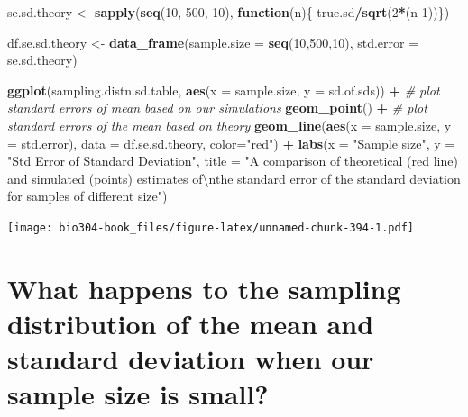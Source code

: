 \documentclass[]{book}
\newenvironment{Shaded}{\begin{snugshade}}{\end{snugshade}}
\newcommand{\CharTok}[1]{\textcolor[rgb]{0.31,0.60,0.02}{#1}}
\newcommand{\CommentTok}[1]{\textcolor[rgb]{0.56,0.35,0.01}{\textit{#1}}}
\newcommand{\ControlFlowTok}[1]{\textcolor[rgb]{0.13,0.29,0.53}{\textbf{#1}}}
\newcommand{\DataTypeTok}[1]{\textcolor[rgb]{0.13,0.29,0.53}{#1}}
\newcommand{\DecValTok}[1]{\textcolor[rgb]{0.00,0.00,0.81}{#1}}
\newcommand{\KeywordTok}[1]{\textcolor[rgb]{0.13,0.29,0.53}{\textbf{#1}}}
\newcommand{\NormalTok}[1]{#1}
\newcommand{\OperatorTok}[1]{\textcolor[rgb]{0.81,0.36,0.00}{\textbf{#1}}}
\newcommand{\StringTok}[1]{\textcolor[rgb]{0.31,0.60,0.02}{#1}}
\theoremstyle{definition}
\theoremstyle{definition}
\theoremstyle{definition}
\theoremstyle{remark}
\begin{document}
\begin{Shaded}
\begin{Highlighting}[]
\NormalTok{se.sd.theory <-}\StringTok{ }\KeywordTok{sapply}\NormalTok{(}\KeywordTok{seq}\NormalTok{(}\DecValTok{10}\NormalTok{, }\DecValTok{500}\NormalTok{, }\DecValTok{10}\NormalTok{), }
                       \ControlFlowTok{function}\NormalTok{(n)\{ true.sd}\OperatorTok{/}\KeywordTok{sqrt}\NormalTok{(}\DecValTok{2}\OperatorTok{*}\NormalTok{(n}\DecValTok{-1}\NormalTok{))\})}

\NormalTok{df.se.sd.theory <-}\StringTok{ }\KeywordTok{data_frame}\NormalTok{(}\DataTypeTok{sample.size =} \KeywordTok{seq}\NormalTok{(}\DecValTok{10}\NormalTok{,}\DecValTok{500}\NormalTok{,}\DecValTok{10}\NormalTok{), }
                              \DataTypeTok{std.error =}\NormalTok{ se.sd.theory)}

\KeywordTok{ggplot}\NormalTok{(sampling.distn.sd.table, }\KeywordTok{aes}\NormalTok{(}\DataTypeTok{x =}\NormalTok{ sample.size, }\DataTypeTok{y =}\NormalTok{ sd.of.sds)) }\OperatorTok{+}
\StringTok{   }\CommentTok{# plot standard errors of mean based on our simulations}
\StringTok{  }\KeywordTok{geom_point}\NormalTok{() }\OperatorTok{+}\StringTok{  }
\StringTok{  }\CommentTok{# plot standard errors of the mean based on theory}
\StringTok{  }\KeywordTok{geom_line}\NormalTok{(}\KeywordTok{aes}\NormalTok{(}\DataTypeTok{x =}\NormalTok{ sample.size, }\DataTypeTok{y =}\NormalTok{ std.error), }\DataTypeTok{data =}\NormalTok{ df.se.sd.theory, }\DataTypeTok{color=}\StringTok{"red"}\NormalTok{) }\OperatorTok{+}
\StringTok{  }\KeywordTok{labs}\NormalTok{(}\DataTypeTok{x =} \StringTok{"Sample size"}\NormalTok{, }\DataTypeTok{y =} \StringTok{"Std Error of Standard Deviation"}\NormalTok{,}
       \DataTypeTok{title =} \StringTok{"A comparison of theoretical (red line) and simulated (points) estimates of}\CharTok{\textbackslash{}n}\StringTok{the standard error of the standard deviation for samples of different size"}\NormalTok{)}
\end{Highlighting}
\end{Shaded}

\texttt{[image: bio304-book\_files/figure-latex/unnamed-chunk-394-1.pdf]}

\hypertarget{what-happens-to-the-sampling-distribution-of-the-mean-and-standard-deviation-when-our-sample-size-is-small}{%
\section{What happens to the sampling distribution of the mean and
standard deviation when our sample size is
small?}\label{what-happens-to-the-sampling-distribution-of-the-mean-and-standard-deviation-when-our-sample-size-is-small}}
\end{document}
